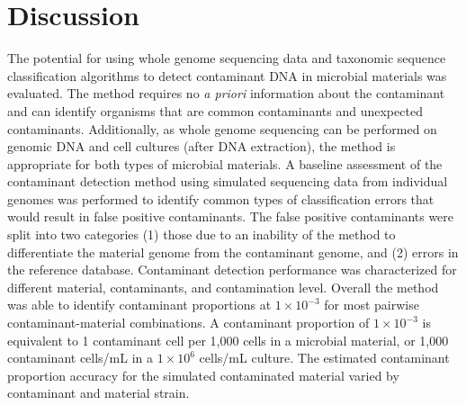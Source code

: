 \documentclass[fleqn,10pt,lineno]{wlpeerj}\usepackage[]{graphicx}\usepackage[]{color}
\begin{document}
\section*{Discussion}

The potential for using whole genome sequencing data and taxonomic sequence classification algorithms to detect contaminant DNA in microbial materials was evaluated.
The method requires no \textit{a priori} information about the contaminant and can identify organisms that are common contaminants and unexpected contaminants.
Additionally, as whole genome sequencing can be performed on genomic DNA and cell cultures (after DNA extraction), the method is appropriate for both types of microbial materials.
A baseline assessment of the contaminant detection method using simulated sequencing data from individual genomes was performed to identify common types of classification errors that would result in false positive contaminants.
The false positive contaminants were split into two categories (1) those due to an inability of the method to differentiate the material genome from the contaminant genome, and (2) errors in the reference database.
Contaminant detection performance was characterized for different material, contaminants, and contamination level.
Overall the method was able to identify contaminant proportions at $1 \times 10^{-3}$ for most pairwise contaminant-material combinations.
A contaminant proportion of $1 \times 10^{-3}$ is equivalent to 1 contaminant cell per 1,000 cells in a microbial material, or 1,000 contaminant cells/mL in a $1 \times 10^{6}$ cells/mL culture.
The estimated contaminant proportion accuracy for the simulated contaminated material varied by contaminant and material strain.


\end{document}
